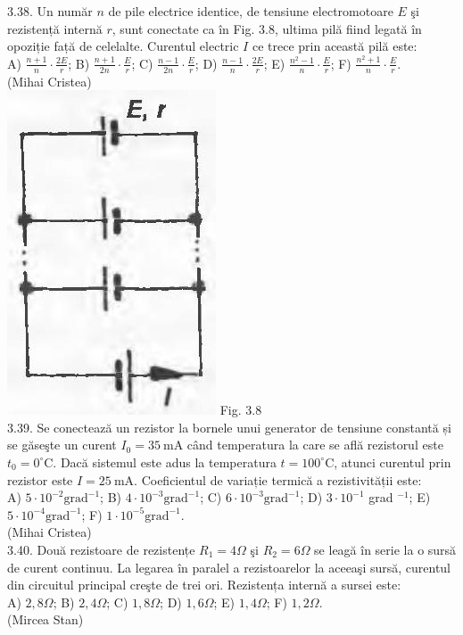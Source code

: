 3.38. Un număr $n$ de pile electrice identice, de tensiune electromotoare $E$ şi rezistență internă $r$, sunt conectate ca în Fig. 3.8, ultima pilă fiind legată în opoziție față de celelalte. Curentul electric $I$ ce trece prin această pilă este:\\ A) $\frac{n+1}{n} \cdot \frac{2 E}{r}$; B) $\frac{n+1}{2 n} \cdot \frac{E}{r}$; C) $\frac{n-1}{2 n} \cdot \frac{E}{r}$; D) $\frac{n-1}{n} \cdot \frac{2 E}{r}$; E) $\frac{n^{2}-1}{n} \cdot \frac{E}{r}$; F) $\frac{n^{2}+1}{n} \cdot \frac{E}{r}$.\\ (Mihai Cristea)\\ \includegraphics[width=0.4\linewidth]{images/2025_07_01_5b3ff9fa0d508c8e9f17g-151(1)} Fig. 3.8\\

3.39. Se conectează un rezistor la bornele unui generator de tensiune constantă și se găseşte un curent $I_{0}=35 \mathrm{~mA}$ când temperatura la care se află rezistorul este $t_{0}=0^{\circ} \mathrm{C}$. Dacă sistemul este adus la temperatura $t=100^{\circ} \mathrm{C}$, atunci curentul prin rezistor este $I=25 \mathrm{~mA}$. Coeficientul de variație termică a rezistivității este:\\ A) $5 \cdot 10^{-2} \mathrm{grad}^{-1}$; B) $4 \cdot 10^{-3} \mathrm{grad}^{-1}$; C) $6 \cdot 10^{-3} \mathrm{grad}^{-1}$; D) $3 \cdot 10^{-1}$ grad $^{-1}$; E) $5 \cdot 10^{-4} \mathrm{grad}^{-1}$; F) $1 \cdot 10^{-5} \mathrm{grad}^{-1}$.\\ (Mihai Cristea)\\

3.40. Două rezistoare de rezistențe $R_{1}=4 \Omega$ şi $R_{2}=6 \Omega$ se leagă în serie la o sursă de curent continuu. La legarea în paralel a rezistoarelor la aceeaşi sursă, curentul din circuitul principal creşte de trei ori. Rezistența internă a sursei este:\\ A) $2,8 \Omega$; B) $2,4 \Omega$; C) $1,8 \Omega$; D) $1,6 \Omega$; E) $1,4 \Omega$; F) $1,2 \Omega$.\\ (Mircea Stan)\\

